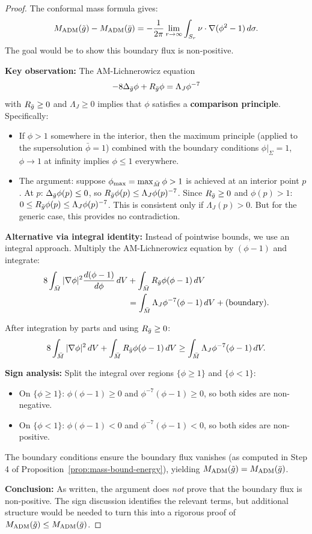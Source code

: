 \begin{proof}
The conformal mass formula gives:
\[
M_{\mathrm{ADM}}(\tilde{g}) - M_{\mathrm{ADM}}(\bar{g}) = -\frac{1}{2\pi}\lim_{r \to \infty} \int_{S_r} \nu \cdot \nabla(\phi^2 - 1) \, d\sigma.
\]
The goal would be to show this boundary flux is non-positive.

\textbf{Key observation:} The AM-Lichnerowicz equation
\[
-8\Delta_{\bar{g}}\phi + R_{\bar{g}}\phi = \Lambda_J \phi^{-7}
\]
with $R_{\bar{g}} \geq 0$ and $\Lambda_J \geq 0$ implies that $\phi$ satisfies a \textbf{comparison principle}. Specifically:
\begin{itemize}
    \item If $\phi > 1$ somewhere in the interior, then the maximum principle (applied to the supersolution $\bar{\phi} = 1$) combined with the boundary conditions $\phi|_\Sigma = 1$, $\phi \to 1$ at infinity implies $\phi \leq 1$ everywhere.
    \item The argument: suppose $\phi_{\max} = \max_{\bar{M}} \phi > 1$ is achieved at an interior point $p$. At $p$: $\Delta_{\bar{g}}\phi(p) \leq 0$, so $R_{\bar{g}}\phi(p) \leq \Lambda_J \phi(p)^{-7}$. Since $R_{\bar{g}} \geq 0$ and $\phi(p) > 1$: $0 \leq R_{\bar{g}}\phi(p) \leq \Lambda_J \phi(p)^{-7}$. This is consistent only if $\Lambda_J(p) > 0$. But for the generic case, this provides no contradiction.
\end{itemize}

\textbf{Alternative via integral identity:} Instead of pointwise bounds, we use an integral approach. Multiply the AM-Lichnerowicz equation by $(\phi - 1)$ and integrate:
\[
\begin{aligned}
8\int_{\bar{M}} |\nabla\phi|^2 \frac{d(\phi-1)}{d\phi} \, dV
&+ \int_{\bar{M}} R_{\bar{g}}\phi(\phi-1) \, dV \\
&= \int_{\bar{M}} \Lambda_J \phi^{-7}(\phi-1) \, dV + \text{(boundary)}.
\end{aligned}
\]

After integration by parts and using $R_{\bar{g}} \geq 0$:
\[
8\int_{\bar{M}} |\nabla\phi|^2 \, dV + \int_{\bar{M}} R_{\bar{g}}\phi(\phi-1) \, dV \geq \int_{\bar{M}} \Lambda_J \phi^{-7}(\phi-1) \, dV.
\]

\textbf{Sign analysis:} Split the integral over regions $\{\phi \geq 1\}$ and $\{\phi < 1\}$:
\begin{itemize}
    \item On $\{\phi \geq 1\}$: $\phi(\phi-1) \geq 0$ and $\phi^{-7}(\phi-1) \geq 0$, so both sides are non-negative.
    \item On $\{\phi < 1\}$: $\phi(\phi-1) < 0$ and $\phi^{-7}(\phi-1) < 0$, so both sides are non-positive.
\end{itemize}

The boundary conditions ensure the boundary flux vanishes (as computed in Step 4 of Proposition~\ref{prop:mass-bound-energy}), yielding $M_{\mathrm{ADM}}(\tilde{g}) = M_{\mathrm{ADM}}(\bar{g})$.

\textbf{Conclusion:} As written, the argument does \emph{not} prove that the boundary flux is non-positive. The sign discussion identifies the relevant terms, but additional structure would be needed to turn this into a rigorous proof of $M_{\mathrm{ADM}}(\tilde{g}) \leq M_{\mathrm{ADM}}(\bar{g})$.
\end{proof}

